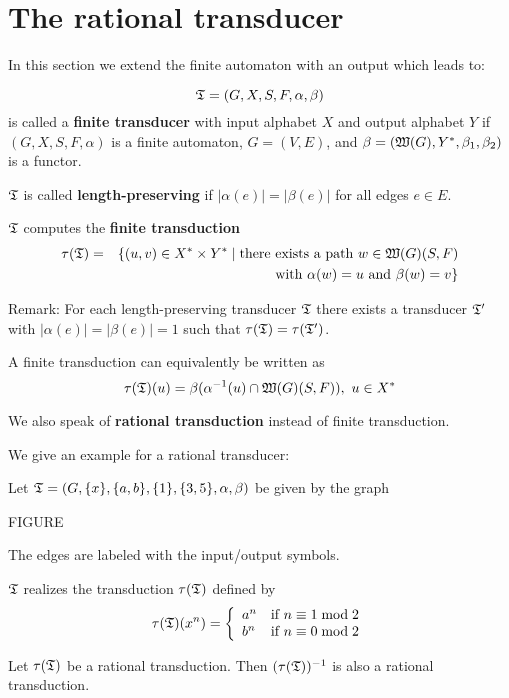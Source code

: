 \section{The rational transducer}

In this section we extend the finite automaton with an output which leads to:

\begin{definition}
\[ \mbox{$\mathfrak{T}$} = (G, X, S, F, \alpha, \beta) \] is called a {\bf finite transducer}
with input alphabet $X$ and output alphabet $Y$ if $(G, X, S, F, \alpha)$ is a
finite automaton, $G = (V, E)$, and $\beta = (\mbox{$\mathfrak{W}(G)$}, Y^*, \beta_1,
\beta_2)$ is a functor.
\end{definition}

$\mbox{$\mathfrak{T}$}$ is called {\bf length-preserving} if $|\alpha(e)| = |\beta(e)|$ for all
edges $e \in E$.

$\mbox{$\mathfrak{T}$}$ computes the {\bf finite transduction}
\begin{eqnarray*}
\tau(\mbox{$\mathfrak{T}$}) & = & \{ (u, v) \in X^* \times Y^* \mid \mbox{there
exists a path } w \in \mbox{$\mathfrak{W}(G)$}(S, F) \\
& &  \mbox{ with } \alpha(w) = u \mbox{ and } \beta(w) = v \}
\end{eqnarray*}

Remark: For each length-preserving transducer $\mbox{$\mathfrak{T}$}$ there exists a
transducer $\mbox{$\mathfrak{T'}$}$ with $|\alpha(e)| = |\beta(e)| = 1$ such that
$\tau(\mbox{$\mathfrak{T}$}) = \tau(\mbox{$\mathfrak{T'}$})$.

A finite transduction can equivalently be written as 
\[ \tau(\mbox{$\mathfrak{T}$})(u) = \beta(\alpha^{-1}(u) \cap \mbox{$\mathfrak{W}(G)$}(S, F)),\ u \in X^* \]

We also speak of {\bf rational transduction} instead of finite transduction.

We give an example for a rational transducer:

Let $\mbox{$\mathfrak{T}$} = (G, \{x\}, \{a, b\}, \{1\}, \{3, 5\}, \alpha, \beta)$ be given by
the graph

FIGURE

The edges are labeled with the input/output symbols.

$\mbox{$\mathfrak{T}$}$ realizes the transduction $\tau(\mbox{$\mathfrak{T}$})$ defined by
\[ \tau(\fa{T})(x^n) = \left\{ 
\begin{array}{l@{\quad}l}
a^n & \mbox{if } n \equiv 1 \bmod 2 \\
b^n & \mbox{if } n \equiv 0 \bmod 2
\end{array}
\right. \]

\begin{lemma}
Let $\tau(\mbox{$\mathfrak{T}$})$ be a rational transduction. Then $(\tau(\mbox{$\mathfrak{T}$}))^{-1}$ is
also a rational transduction.
\end{lemma}

